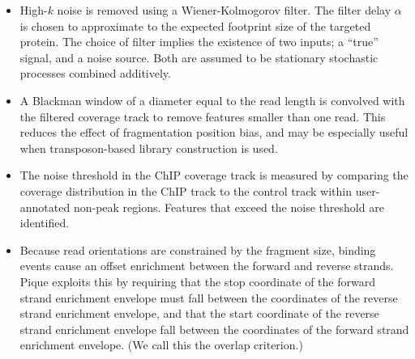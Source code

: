 \begin{refsection}
\begin{itemize}

%

\item High-$k$ noise is removed using a Wiener-Kolmogorov
  filter. \cite{wiener} The filter delay $\alpha$ is chosen to
  approximate to the expected footprint size of the targeted
  protein. The choice of filter implies the existence of two inputs; a
  ``true'' signal, and a noise source. Both are assumed to be
  stationary stochastic processes combined additively.


\item A Blackman window of a diameter equal to the read length is
  convolved with the filtered coverage track to remove features
  smaller than one read. This reduces the effect of fragmentation
  position bias, and may be especially useful when transposon-based
  library construction is used.

\item The noise threshold in the ChIP coverage track is measured by
  comparing the coverage distribution in the ChIP track to the control
  track within user-annotated non-peak regions. Features that exceed
  the noise threshold are identified.

\item Because read orientations are constrained by the fragment size,
  binding events cause an offset enrichment between the forward and
  reverse strands. Pique exploits this by requiring that the stop
  coordinate of the forward strand enrichment envelope must fall
  between the coordinates of the reverse strand enrichment envelope,
  and that the start coordinate of the reverse strand enrichment
  envelope fall between the coordinates of the forward strand
  enrichment envelope. (We call this the overlap criterion.)


\end{itemize}
\end{refsection}
